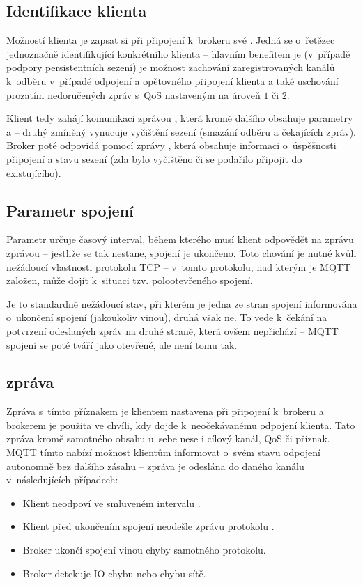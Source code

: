 \subsection{Identifikace klienta }\label{subsec:identifikace-klienta-client-id}
Možností klienta je zapsat si při připojení k~brokeru své .
Jedná se o~řetězec jednoznačně identifikující konkrétního klienta -- hlavním benefitem je (v~případě podpory
persistentních sezení) je možnost zachování zaregistrovaných kanálů k~odběru v~případě odpojení a
opětovného připojení klienta a také uschování prozatím nedoručených zpráv s~QoS nastaveným na úroveň $1$ či $2$.

Klient tedy zahájí komunikaci zprávou , která kromě dalšího obsahuje parametry  a  -- druhý zmíněný vynucuje vyčištění sezení (smazání odběru a čekajících zpráv).
Broker poté odpovídá pomocí zprávy , která obsahuje informaci o~úspěšnosti připojení a stavu sezení (zda
bylo vyčištěno či se podařilo připojit do existujícího).

\subsection{Parametr spojení }\label{subsec:parametr-spojeni-keep-alive}
Parametr  určuje časový interval, během kterého musí klient odpovědět na zprávu  zprávou
 -- jestliže se tak nestane, spojení je ukončeno.
Toto chování je nutné kvůli nežádoucí vlastnosti protokolu TCP --
v~tomto protokolu, nad kterým je MQTT založen, může dojít k~situaci tzv. polootevřeného spojení.

Je to standardně nežádoucí stav, při kterém je jedna ze stran spojení informována o~ukončení spojení (jakoukoliv
vinou), druhá však ne.
To vede k~čekání na potvrzení odeslaných zpráv na druhé straně, která ovšem nepřichází -- MQTT spojení se poté
tváří jako otevřené, ale není tomu tak.

\subsection{ zpráva}\label{subsec:last-will-zprava}
Zpráva s~tímto příznakem je klientem nastavena při připojení k~brokeru a brokerem je použita ve chvíli, kdy dojde
k~neočekávanému odpojení klienta.
Tato zpráva  kromě samotného obsahu u~sebe nese i cílový kanál, QoS či 
příznak.
MQTT tímto nabízí možnost klientům informovat o~svém stavu odpojení autonomně bez dalšího zásahu --
 zpráva je odeslána do daného kanálu v~následujících případech:
\begin{itemize}
    \item Klient neodpoví ve smluveném intervalu .
    \item Klient před ukončením spojení neodešle zprávu protokolu .
    \item Broker ukončí spojení vinou chyby samotného protokolu.
    \item Broker detekuje IO chybu nebo chybu sítě.
\end{itemize}

